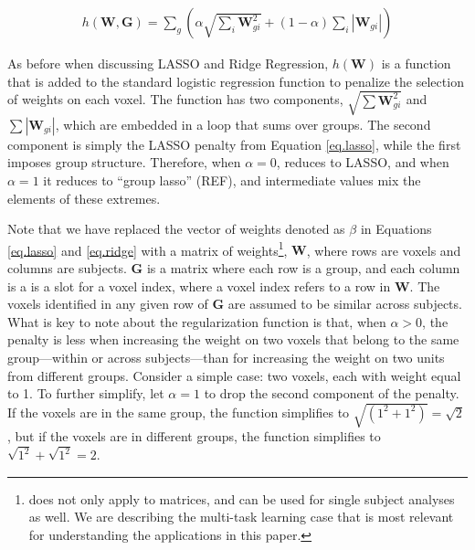 
\begin{align}
h(\mathbf{W},\mathbf{G}) = \sum_{g}\left(  \alpha \sqrt{\sum_{i} \mathbf{W}_{gi}^2} + (1-\alpha) \sum_{i} |\mathbf{W}_{gi}| \right) 
\end{align}

As before when discussing LASSO and Ridge Regression, $h(\mathbf{W})$ is a function that is added to the standard logistic regression function to penalize the selection of weights on each voxel. The function has two components, $\sqrt{\sum{\mathbf{W}^2_{gi}}}$ and $\sum{|\mathbf{W}_{gi}|}$, which are embedded in a loop that sums over groups. The second component is simply the LASSO penalty from Equation \ref{eq.lasso}, while the first imposes group structure. Therefore, when $\alpha=0$, \soslasso reduces to LASSO, and when $\alpha=1$ it reduces to ``group lasso'' (REF), and intermediate values mix the elements of these extremes. 

Note that we have replaced the vector of weights denoted as $\beta$ in Equations \ref{eq.lasso} and \ref{eq.ridge} with a matrix of weights\footnote{\soslasso does not only apply to matrices, and can be used for single subject analyses as well. We are describing the multi-task learning case that is most relevant for understanding the applications in this paper.}, $\mathbf{W}$, where rows are voxels and columns are subjects. $\mathbf{G}$ is a matrix where each row is a group, and each column is a is a slot for a voxel index, where a voxel index refers to a row in $\mathbf{W}$. The voxels identified in any given row of $\mathbf{G}$ are assumed to be similar across subjects. What is key to note about the \soslasso regularization function is that, when $\alpha>0$, the penalty is less when increasing the weight on two voxels that belong to the same group---within or across subjects---than for increasing the weight on two units from different groups. Consider a simple case: two voxels, each with weight equal to 1. To further simplify, let $\alpha = 1$ to drop the second component of the penalty. If the voxels are in the same group, the function simplifies to $\sqrt{(1^2 + 1^2)} = \sqrt{2}$, but if the voxels are in different groups, the function simplifies to $\sqrt{1^2} + \sqrt{1^2} = 2$.

